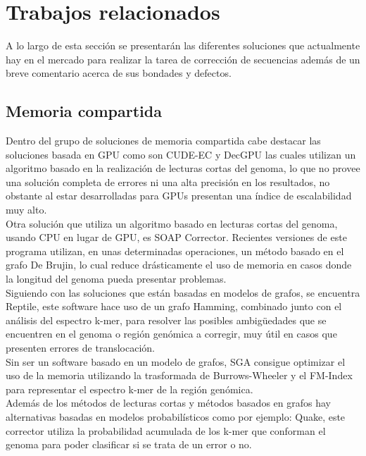 \documentclass[conference]{IEEEtran}
\begin{document}
\section{Trabajos relacionados}

A lo largo de esta sección se presentarán las diferentes soluciones que actualmente hay en el mercado para realizar la tarea de corrección de secuencias además de un breve comentario acerca de sus bondades y defectos.

\subsection{Memoria compartida}

Dentro del grupo de soluciones de memoria compartida cabe destacar las soluciones basada en GPU como son CUDE-EC y DecGPU las cuales utilizan un algoritmo basado en la realización de lecturas cortas del genoma, lo que no provee una solución completa de errores ni una alta precisión en los resultados, no obstante al estar desarrolladas para GPUs presentan una índice de escalabilidad muy alto.\\

Otra solución que utiliza un algoritmo basado en lecturas cortas del genoma, usando CPU en lugar de GPU, es SOAP Corrector. Recientes versiones de este programa utilizan, en unas determinadas operaciones, un método basado en el grafo De Brujin, lo cual reduce drásticamente el uso de memoria en casos donde la longitud del genoma pueda presentar problemas.\\

Siguiendo con las soluciones que están basadas en modelos de grafos, se encuentra Reptile, este software hace uso de un grafo Hamming, combinado junto con el análisis del espectro k-mer, para resolver las posibles ambigüedades que se encuentren en el genoma o región genómica a corregir, muy útil en casos que presenten errores de translocación.\\

Sin ser un software basado en un modelo de grafos, SGA consigue optimizar el uso de la memoria utilizando la trasformada de Burrows-Wheeler y el FM-Index para representar el espectro k-mer de la región genómica.\\

Además de los métodos de lecturas cortas y métodos basados en grafos hay alternativas basadas en modelos probabilísticos como por ejemplo: Quake, este corrector utiliza la probabilidad acumulada de los k-mer que conforman el genoma para poder clasificar si se trata de un error o no.\\
\end{document}
